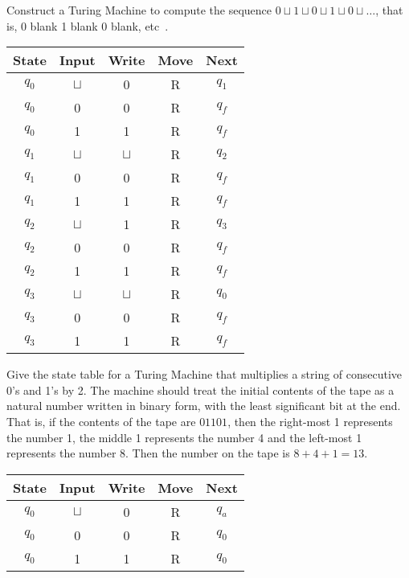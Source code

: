 \documentclass[a4paper, 12pt]{exam}
\begin{document}
\begin{questions}
\question
  Construct a Turing Machine to compute the sequence $0 \sqcup 1 \sqcup 0 \sqcup 1 \sqcup 0 \sqcup \ldots$, that is, 0 blank 1 blank 0 blank, etc~\cite{turing37}.
  \begin{solution}
    \begin{table}[H]
      \centering
      \begin{tabular}{ccccc}
        \toprule
            State & Input & Write & Move & Next \\
        \midrule
            $q_0$ & $\sqcup$ & 0 & R & $q_1$ \\
            $q_0$ & 0 & 0 & R & $q_f$ \\
            $q_0$ & 1 & 1 & R & $q_f$ \\
        \midrule
            $q_1$ & $\sqcup$ & $\sqcup$ & R & $q_2$ \\
            $q_1$ & 0 & 0 & R & $q_f$ \\
            $q_1$ & 1 & 1 & R & $q_f$ \\
        \midrule
            $q_2$ & $\sqcup$ & 1 & R & $q_3$ \\
            $q_2$ & 0 & 0 & R & $q_f$ \\
            $q_2$ & 1 & 1 & R & $q_f$ \\
        \midrule
            $q_3$ & $\sqcup$ & $\sqcup$ & R & $q_0$ \\
            $q_3$ & 0 & 0 & R & $q_f$ \\
            $q_3$ & 1 & 1 & R & $q_f$ \\
        \bottomrule
        \hline
      \end{tabular}
    \end{table}
  \end{solution}
 

\question
  Give the state table for a Turing Machine that multiplies a string of consecutive 0's and 1's by 2.
  The machine should treat the initial contents of the tape as a natural number written in binary form, with the least significant bit at the end.
  That is, if the contents of the tape are $01101$, then the right-most 1 represents the number 1, the middle 1 represents the number 4 and the left-most 1 represents the number 8.
  Then the number on the tape is $8+4+1=13$.
  \begin{solution}
    \begin{table}[H]
      \centering
      \begin{tabular}{ccccc}
        \toprule
            State & Input & Write & Move & Next \\
        \midrule
            $q_0$ & $\sqcup$ & 0 & R & $q_a$ \\
            $q_0$ & 0 & 0 & R & $q_0$ \\
            $q_0$ & 1 & 1 & R & $q_0$ \\
        \bottomrule
        \hline
      \end{tabular}
    \end{table}
  \end{solution}



\end{questions}
\end{document}
